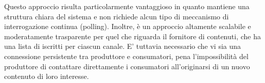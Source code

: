 Questo approccio risulta particolarmente vantaggioso in quanto mantiene una struttura chiara del sistema e non richiede alcun tipo di meccanismo di interrogazione continua (polling). Inoltre, è un approccio altamente scalabile e moderatamente trasparente per quel che riguarda il fornitore di contenuti, che ha una lista di iscritti per ciascun canale. E' tuttavia necessario che vi sia una connessione persistente tra produttore e consumatori, pena l'impossibilità del produttore di contattare direttamente i consumatori all'originarsi di un nuovo contenuto di loro interesse.

